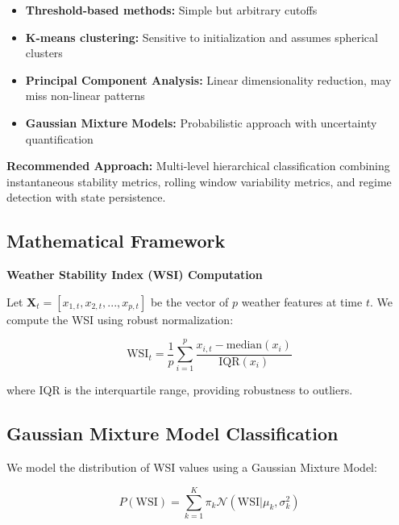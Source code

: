 \documentclass[11pt,a4paper]{article}
\begin{document}
\begin{itemize}
    \item \textbf{Threshold-based methods:} Simple but arbitrary cutoffs
    \item \textbf{K-means clustering:} Sensitive to initialization and assumes spherical clusters
    \item \textbf{Principal Component Analysis:} Linear dimensionality reduction, may miss non-linear patterns
    \item \textbf{Gaussian Mixture Models:} Probabilistic approach with uncertainty quantification
\end{itemize}

\begin{solutionbox}
\textbf{Recommended Approach:} Multi-level hierarchical classification combining instantaneous stability metrics, rolling window variability metrics, and regime detection with state persistence.
\end{solutionbox}

\subsection{Mathematical Framework}

\begin{mathbox}
\textbf{Weather Stability Index (WSI) Computation}

Let $\mathbf{X}_t = [x_{1,t}, x_{2,t}, ..., x_{p,t}]$ be the vector of $p$ weather features at time $t$. We compute the WSI using robust normalization:

\begin{equation}
\text{WSI}_t = \frac{1}{p} \sum_{i=1}^{p} \frac{x_{i,t} - \text{median}(x_i)}{\text{IQR}(x_i)}
\end{equation}

where IQR is the interquartile range, providing robustness to outliers.
\end{mathbox}

\subsection{Gaussian Mixture Model Classification}

We model the distribution of WSI values using a Gaussian Mixture Model:

\begin{equation}
P(\text{WSI}) = \sum_{k=1}^{K} \pi_k \mathcal{N}(\text{WSI} | \mu_k, \sigma_k^2)
\end{equation}
\end{document}

